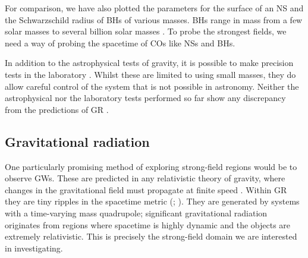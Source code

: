 For comparison, we have also plotted the parameters for the surface of an NS and the Schwarzschild radius of BHs of various masses. BHs range in mass from a few solar masses \citep{Ozel2010} to several billion solar masses \citep{Hlavacek-Larrondo2012}. To probe the strongest fields, we need a way of probing the spacetime of COs like NSs and BHs.

In addition to the astrophysical tests of gravity, it is possible to make precision tests in the laboratory \citep{Kapner2007a,Adelberger2009,Wagner2012}. Whilst these are limited to using small masses, they do allow careful control of the system that is not possible in astronomy. Neither the astrophysical nor the laboratory tests performed so far show any discrepancy from the predictions of GR \citep{Will2006}. 

\subsection{Gravitational radiation}

One particularly promising method of exploring strong-field regions would be to observe GWs. These are predicted in any relativistic theory of gravity, where changes in the gravitational field must propagate at finite speed \citep{Schutz1984}. Within GR they are tiny ripples in the spacetime metric (\citealt[section 35.1]{Misner1973}; \citealt[section 107]{Landau1975}). They are generated by systems with a time-varying mass quadrupole; significant gravitational radiation originates from regions where spacetime is highly dynamic and the objects are extremely relativistic. This is precisely the strong-field domain we are interested in investigating.

